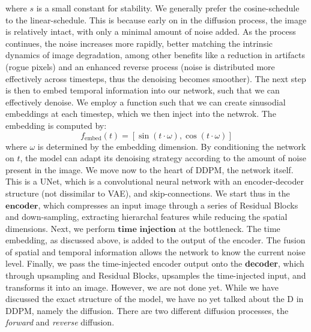 \documentclass{article}
\begin{document}
where $s$ is a small constant for stability.
\newline
We generally prefer the cosine-schedule to the linear-schedule. This is because early on in the diffusion process, the image is relatively intact, with only a minimal amount of noise added. As the process continues, the noise increases more rapidly, better matching the intrinsic dynamics of image degradation, among other benefits like a reduction in artifacts (rogue pixels) and an enhanced reverse process (noise is distributed more effectively across timesteps, thus the denoising becomes smoother).
\newline
The next step is then to embed temporal information into our network, such that we can effectively denoise. We employ a function such that we can create sinusodial embeddings at each timestep, which we then inject into the netwrok. The embedding is computed by:
\begin{equation}
    f_{\text{embed}}(t) = [\sin(t \cdot \omega), \cos(t \cdot \omega)]
\end{equation}
where $\omega$ is determined by the embedding dimension. By conditioning the network on $t$, the model can adapt its denoising strategy according to the amount of noise present in the image.
\newline
We move now to the heart of DDPM, the network itself. This is a UNet, which is a convolutional neural network with an encoder-decoder structure (not dissimilar to VAE), and skip-connections. 
\newline
We start thus in the $\textbf{encoder}$, which compresses an input image through a series of Residual Blocks and down-sampling, extracting hierarchal features while reducing the spatial dimensions.
\newline
Next, we perform $\textbf{time injection}$ at the bottleneck. The time embedding, as discussed above, is added to the output of the encoder. The fusion of spatial and temporal information allows the network to know the current noise level.
\newline
Finally, we pass the time-injected encoder output onto the \textbf{decoder}, which through upsampling and Residual Blocks, upsamples the time-injected input, and transforms it into an image.
\newline
However, we are not done yet. While we have discussed the exact structure of the model, we have no yet talked about the D in DDPM, namely the diffusion. There are two different diffusion processes, the \emph{forward} and \emph{reverse} diffusion. 
\newline
\end{document}
